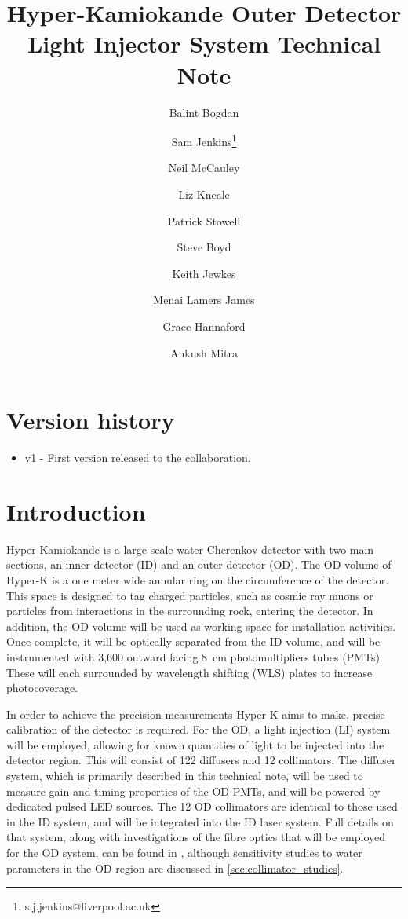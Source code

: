 \documentclass[a4paper,11pt]{article}
\begin{document}
\title{Hyper-Kamiokande Outer Detector Light Injector System Technical Note}
\author[1]{Balint Bogdan}
\author[1]{Sam Jenkins\footnote{s.j.jenkins@liverpool.ac.uk}}
\author[1]{Neil McCauley}
\author[2]{Liz Kneale}
\author[2]{Patrick Stowell}
\author[3]{Steve Boyd}
\author[3]{Keith Jewkes}
\author[3]{Menai Lamers James}
\author[3]{Grace Hannaford}
\author[3]{Ankush Mitra}

\maketitle

\tableofcontents

\newpage

\section{Version history}
\begin{itemize}
\item v1 - First version released to the collaboration.
\end{itemize}

\newpage

\section{Introduction}
\label{sec:intro}

Hyper-Kamiokande is a large scale water Cherenkov detector with two main sections, an inner detector (ID) and an outer detector (OD). The OD volume of Hyper-K is a one meter wide annular ring on the circumference of the detector. This space is designed to tag charged particles, such as cosmic ray muons or particles from interactions in the surrounding rock, entering the detector. In addition, the OD volume will be used as working space for installation activities. Once complete, it will be optically separated from the ID volume, and will be instrumented with 3,600 outward facing 8~cm photomultipliers tubes (PMTs). These will each surrounded by wavelength shifting (WLS) plates to increase photocoverage.

In order to achieve the precision measurements Hyper-K aims to make, precise calibration of the detector is required. For the OD, a light injection (LI) system will be employed, allowing for known quantities of light to be injected into the detector region. This will consist of 122 diffusers and 12 collimators. The diffuser system, which is primarily described in this technical note, will be used to measure gain and timing properties of the OD PMTs, and will be powered by dedicated pulsed LED sources. The 12 OD collimators are identical to those used in the ID system, and will be integrated into the ID laser system. Full details on that system, along with investigations of the fibre optics that will be employed for the OD system, can be found in \cite{TN91}, although sensitivity studies to water parameters in the OD region are discussed in \cref{sec:collimator_studies}.
\end{document}
